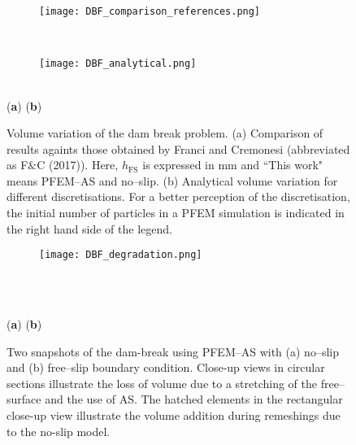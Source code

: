 \documentclass[final,3p,times]{elsarticle}
\begin{document}
\begin{figure}[t!]
\captionsetup[subfigure]{labelformat=empty}
\centering 
	\begin{subfigure}[b]{0.48\textwidth}
		\texttt{[image: DBF\_comparison\_references.png]}
		\caption{}
		\label{Fig:dbf_results1_a}
	\end{subfigure}
	~
	\begin{subfigure}[b]{0.48\textwidth}	
		\texttt{[image: DBF\_analytical.png]}
		\caption{}
		\label{Fig:dbf_results1_b}
	\end{subfigure}
	\\
	\vspace{-67mm}
	\hspace{-80mm} \footnotesize{(\textbf{a})} \hspace{75mm} (\textbf{b}) 
	\\
	\vspace{57mm}
	\caption{Volume variation of the dam break problem. (a) Comparison of results againts those obtained by Franci and Cremonesi \citep{franci2017effect} (abbreviated as F$\&$C (2017)). Here, $h_\mathrm{FS}$ is expressed in mm and ``This work" means PFEM--AS and no--slip. (b) Analytical volume variation for different discretisations. For a better perception of the discretisation, the initial number of particles in a PFEM simulation is indicated in the right hand side of the legend.}
\label{Fig:dbf_results1}
\end{figure}


\begin{figure}[t!]
\captionsetup[subfigure]{labelformat=empty}
\centering 
	\begin{subfigure}[b]{1.0\textwidth}
		\texttt{[image: DBF\_degradation.png]}
		\caption{}
		\label{Fig:dbf_addtriangle_a}
	\end{subfigure}
	~
	\begin{subfigure}[b]{0.0\textwidth}
		\caption{}
		\label{Fig:dbf_addtriangle_b}
	\end{subfigure}
	\\
	\vspace{-43mm}
	\hspace{-65mm} \footnotesize{(\textbf{a})} 
	\hspace{90mm} (\textbf{b}) 
	\\
	\vspace{27mm}
	\caption{Two snapshots of the dam-break using PFEM--AS with (a) no--slip and (b) free--slip boundary condition. Close-up views in circular sections illustrate the loss of volume due to a stretching of the free--surface and the use of AS. The hatched elements in the rectangular close-up view illustrate the volume addition during remeshings due to the no-slip model.}
	\label{Fig:dbf_addtriangle}
\end{figure}
\end{document}
